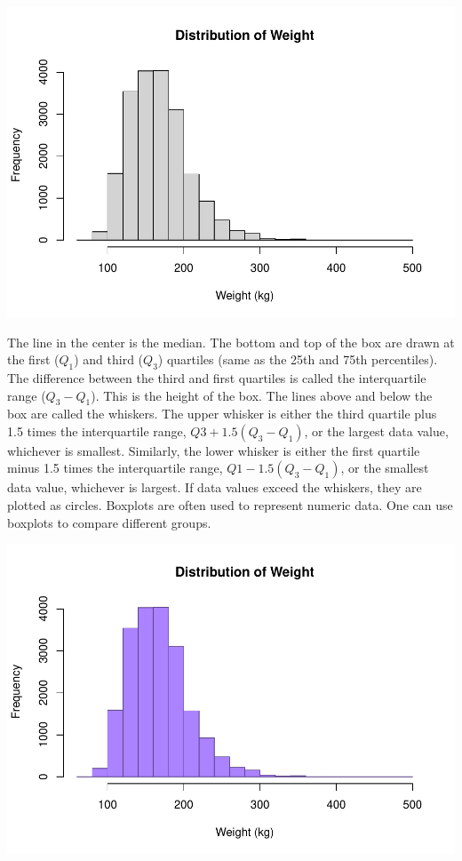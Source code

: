 \documentclass[
]{book}
\newenvironment{Shaded}{\begin{snugshade}}{\end{snugshade}}
\newcommand{\DecValTok}[1]{\textcolor[rgb]{0.00,0.00,0.81}{#1}}
\newcommand{\KeywordTok}[1]{\textcolor[rgb]{0.13,0.29,0.53}{\textbf{#1}}}
\newcommand{\NormalTok}[1]{#1}
\newcommand{\OperatorTok}[1]{\textcolor[rgb]{0.81,0.36,0.00}{\textbf{#1}}}
\newcommand{\StringTok}[1]{\textcolor[rgb]{0.31,0.60,0.02}{#1}}
\begin{document}
\includegraphics{_main_files/figure-latex/unnamed-chunk-129-1.pdf}

The line in the center is the median. The bottom and top of the box are drawn at the first (\(Q_1\)) and third (\(Q_3\)) quartiles (same as the 25th and 75th percentiles). The difference between the third and first quartiles is called the interquartile range (\(Q_3-Q_1\)). This is the height of the box. The lines above and below the box are called the whiskers. The upper whisker is either the third quartile plus 1.5 times the interquartile range, \(Q3 +1.5(Q_3-Q_1)\), or the largest data value, whichever is smallest. Similarly, the lower whisker is either the first quartile minus 1.5 times the interquartile range, \(Q1-1.5(Q_3-Q_1)\), or the smallest data value, whichever is largest. If data values exceed the whiskers, they are plotted as circles. Boxplots are often used to represent numeric data. One can use boxplots to compare different groups.

\begin{Shaded}
\end{Shaded}

\includegraphics{_main_files/figure-latex/unnamed-chunk-130-1.pdf}
\end{document}
